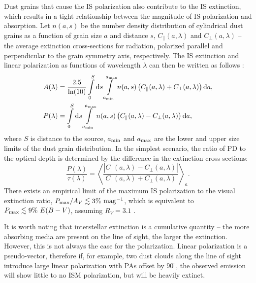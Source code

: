 Dust grains that cause the \gls{IS} polarization also contribute to the \gls{IS} extinction, which results in a tight relationship between the magnitude of \gls{IS} polarization and absorption.
Let $n(a, s)$ be the number density distribution of cylindrical dust grains as a function of grain size $a$ and distance $s$, $C_\parallel\left(a, \lambda\right)$ and $C_\perp\left(a, \lambda\right)$ -- the average extinction cross-sections for radiation, polarized parallel and perpendicular to the grain symmetry axis, respectively.
The \gls{IS} extinction and linear polarization as functions of wavelength $\lambda$ can then be written as follows \citep{LightScat, Li1997,Voshchinnikov2012}:
\begin{align}
    A(\lambda) &= \frac{2.5}{\ln(10)} \displaystyle\int\limits_0^{S}\mathrm{d} s \int\limits_{a_{\mathrm{min}}}^{a_{\mathrm{max}}} n(a, s) \left(C_\parallel(a, \lambda) + C_\perp(a, \lambda)\right) \mathrm{d} a , \\
    P(\lambda) &= \int\limits_0^{S}\mathrm{d} s \int\limits_{a_{\mathrm{min}}}^{a_{\mathrm{max}}} n(a, s) \left(C_\parallel(a, \lambda) - C_\perp(a, \lambda)\right) \mathrm{d} a ,
\end{align} 
where $S$ is distance to the source, $a_{\mathrm{min}}$ and $a_{\mathrm{max}}$ are the lower and upper size limits of the dust grain distribution.
In the simplest scenario, the ratio of \gls{PD} to the optical depth is determined by the difference in the extinction cross-sections:
\begin{equation}
\frac{P(\lambda)}{\tau(\lambda)} = \left\langle\frac{|C_\parallel(a, \lambda) - C_\perp(a, \lambda)|}{C_\parallel(a, \lambda) + C_\perp(a, \lambda)}\right\rangle_a.
\end{equation}
There exists an empirical limit of the maximum \gls{IS} polarization to the visual extinction ratio, $P_{\mathrm{max}} / A_V \lesssim 3\%~\mathrm{mag}^{-1}$, which is equivalent to $P_{\mathrm{max}} \lesssim 9\%~E(B-V)$, assuming $R_V = 3.1$ \citep{Serkowski1975}.


It is worth noting that interstellar extinction is a cumulative quantity -- the more absorbing media are present on the line of sight, the larger the extinction.
However, this is not always the case for the polarization. 
Linear polarization is a pseudo-vector, therefore if, for example, two dust clouds along the line of sight introduce large linear polarization with \glspl{PA} offset by $90^\circ$, the observed emission will show little to no \gls{ISM} polarization, but will be heavily extinct.

